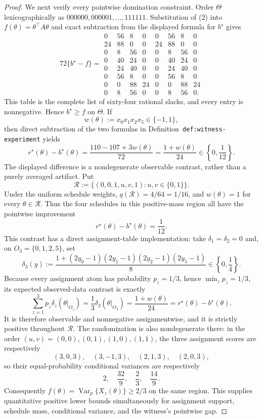 \documentclass{article}
\begin{document}
\begin{proof}
We next verify every pointwise domination constraint.  Order \(\Theta\) lexicographically as \(000000,000001,\ldots,111111\).  Substitution of (2) into \(f(\theta)=\theta^\top A\theta\) and exact subtraction from the displayed formula for \(b^\star\) gives
\[
72\{b^\star-f\}=
\begin{array}{rrrrrrrr}
0&56&8&0&0&56&8&0\\
24&88&0&0&24&88&0&0\\
0&8&56&0&0&8&56&0\\
0&40&24&0&0&40&24&0\\
0&24&40&0&0&24&40&0\\
0&56&8&0&0&56&8&0\\
0&0&88&24&0&0&88&24\\
0&8&56&0&0&8&56&0.
\end{array}
\tag{13}
\]
This table is the complete list of sixty-four rational slacks, and every entry is nonnegative.  Hence \(b^\star\ge f\) on \(\Theta\).  If
\[
w(\theta):=x_0x_1x_2x_5\in\{-1,1\},
\tag{14}
\]
then direct subtraction of the two formulas in Definition~\texttt{def:witness-experiment} yields
\[
r^\star(\theta)-b^\star(\theta)
=\frac{110-107+3w(\theta)}{72}
=\frac{1+w(\theta)}{24}
\in\left\{0,\frac1{12}\right\}.
\tag{15}
\]
The displayed difference is a nondegenerate observable contrast, rather than a purely averaged artifact.  Put
\[
 \mathcal R:=\{(0,0,1,u,v,1):u,v\in\{0,1\}\}.
\tag{15a}
\]
Under the uniform schedule weights, \(q(\mathcal R)=4/64=1/16\), and \(w(\theta)=1\) for every \(\theta\in\mathcal R\).  Thus the four schedules in this positive-mass region all have the pointwise improvement
\[
 r^\star(\theta)-b^\star(\theta)=\frac1{12}.
\tag{15b}
\]
This contrast has a direct assignment-table implementation: take \(\delta_1=\delta_2=0\) and, on \(O_3=\{0,1,2,5\}\), set
\[
 \delta_3(y):=
 \frac{1+(2y_0-1)(2y_1-1)(2y_2-1)(2y_5-1)}8
 \in\left\{0,\frac14\right\}.
\tag{15c}
\]
Because every assignment atom has probability \(p_z=1/3\), hence \(\min_zp_z=1/3\), its expected observed-data contrast is exactly
\[
 \sum_{z=1}^3p_z\delta_z(\theta|_{O_z})
 =\frac13\delta_3(\theta|_{O_3})
 =\frac{1+w(\theta)}{24}
 =r^\star(\theta)-b^\star(\theta).
\tag{15d}
\]
It is therefore observable and nonnegative assignmentwise, and it is strictly positive throughout \(\mathcal R\).  The randomization is also nondegenerate there: in the order \((u,v)=(0,0),(0,1),(1,0),(1,1)\), the three assignment scores are respectively
\[
 (3,0,3),\quad(3,-1,3),\quad(2,1,3),\quad(2,0,3),
\]
so their equal-probability conditional variances are respectively
\[
 2,\quad\frac{32}{9},\quad\frac23,\quad\frac{14}{9}.
\tag{15e}
\]
Consequently \(f(\theta)=\operatorname{Var}_p\{X_z(\theta)\}\ge2/3\) on the same region.  This supplies quantitative positive lower bounds simultaneously for assignment support, schedule mass, conditional variance, and the witness's pointwise gap.


\end{proof}
\end{document}
